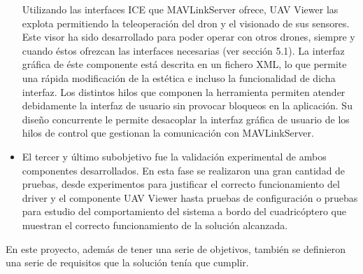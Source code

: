\begin{itemize}
Utilizando las interfaces ICE que MAVLinkServer ofrece, UAV Viewer las explota permitiendo la teleoperación del dron y el visionado de sus sensores. Este visor ha sido desarrollado para poder operar con otros drones, siempre y cuando éstos ofrezcan las interfaces necesarias (ver sección 5.1). La interfaz gráfica de éste componente está descrita en un fichero XML, lo que permite una rápida modificación de la estética e incluso la funcionalidad de dicha interfaz. Los distintos hilos que componen la herramienta permiten atender debidamente la interfaz de usuario sin provocar bloqueos en la aplicación. Su diseño concurrente le permite desacoplar la interfaz gráfica de usuario de los hilos de control que gestionan la comunicación con MAVLinkServer.

\item El tercer y último subobjetivo fue la validación experimental de ambos componentes desarrollados. En esta fase se realizaron una gran cantidad de pruebas, desde experimentos para justificar el correcto funcionamiento del driver y el componente UAV Viewer hasta pruebas de configuración o pruebas para estudio del comportamiento del sistema a bordo del cuadricóptero que muestran el correcto funcionamiento de la solución alcanzada.

\end{itemize}

En este proyecto, además de tener una serie de objetivos, también se definieron una serie de requisitos que la solución tenía que cumplir.

